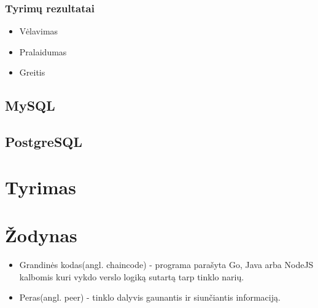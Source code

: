 \documentclass{VUMIFPSkursinis}
\begin{document}
		\subsubsection{Tyrimų rezultatai}
			\begin{itemize}
				\item{Vėlavimas}
				\item{Pralaidumas}
				\item{Greitis}
			\end{itemize}

	\subsection{MySQL}
	\subsection{PostgreSQL}
\section{Tyrimas}

\section{Žodynas}
\begin{itemize}
	\item{Grandinės kodas(angl. chaincode) - programa parašyta Go, Java arba NodeJS kalbomis kuri vykdo
 verslo logiką sutartą tarp tinklo narių.}
	\item{Peras(angl. peer) - tinklo dalyvis gaunantis ir siunčiantis informaciją.}
\end{itemize}


\printbibliography[heading=bibintoc]  
\end{document}
